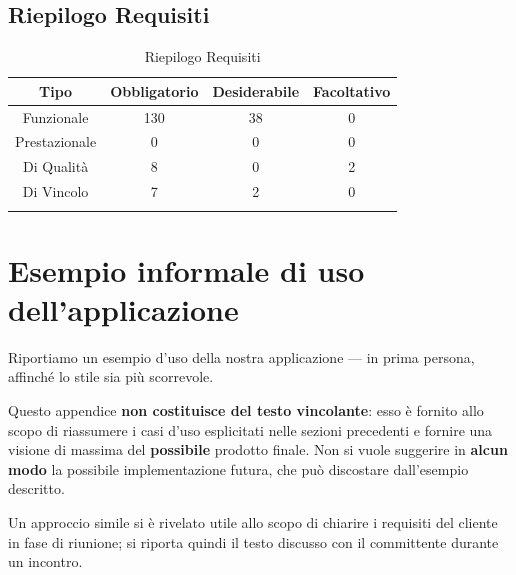 \subsection{Riepilogo Requisiti}
\normalsize
\begin{longtable}{|c|c|c|c|}
\hline 
\textbf{Tipo} & \textbf{Obbligatorio} & \textbf{Desiderabile} & \textbf{Facoltativo}\\
\hline
Funzionale & 130 & 38 & 0\\ \hline
Prestazionale & 0 & 0 & 0\\ \hline
Di Qualità & 8 & 0 & 2\\ \hline
Di Vincolo & 7 & 2 & 0\\ \hline
\caption[Riepilogo Requisiti]{Riepilogo Requisiti}
\label{tabella:riepilogorequi}
\end{longtable}
\clearpage
\appendix
\section{Esempio informale di uso dell'applicazione }


Riportiamo un esempio d'uso della nostra applicazione --- in prima persona, affinché lo stile sia più scorrevole.

Questo appendice \textbf{non costituisce del testo vincolante}: esso è fornito allo scopo di riassumere i casi d'uso esplicitati nelle sezioni precedenti e fornire una visione di massima del \textbf{possibile} prodotto finale. Non si vuole suggerire in \textbf{alcun modo} la possibile implementazione futura, che può discostare dall'esempio descritto.

Un approccio simile si è rivelato utile allo scopo di chiarire i requisiti del cliente in fase di riunione; si riporta quindi il testo discusso con il committente durante un incontro.

